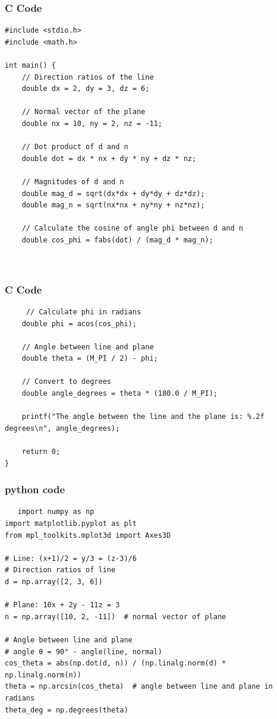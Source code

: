 \documentclass{beamer}
\begin{document}
\begin{frame}[fragile]
    \frametitle{C Code}
    \begin{lstlisting}
#include <stdio.h>
#include <math.h>

int main() {
    // Direction ratios of the line
    double dx = 2, dy = 3, dz = 6;
    
    // Normal vector of the plane
    double nx = 10, ny = 2, nz = -11;
    
    // Dot product of d and n
    double dot = dx * nx + dy * ny + dz * nz;
    
    // Magnitudes of d and n
    double mag_d = sqrt(dx*dx + dy*dy + dz*dz);
    double mag_n = sqrt(nx*nx + ny*ny + nz*nz);
    
    // Calculate the cosine of angle phi between d and n
    double cos_phi = fabs(dot) / (mag_d * mag_n);
    
    

     \end{lstlisting}
\end{frame}
\begin{frame}[fragile]
    \frametitle{C Code }
    \begin{lstlisting}
     // Calculate phi in radians
    double phi = acos(cos_phi);
    
    // Angle between line and plane
    double theta = (M_PI / 2) - phi;
    
    // Convert to degrees
    double angle_degrees = theta * (180.0 / M_PI);
    
    printf("The angle between the line and the plane is: %.2f degrees\n", angle_degrees);
    
    return 0;
}
\end{lstlisting}
\end{frame}
\begin{frame}[fragile]
    \frametitle{python code }
    \begin{lstlisting}
   import numpy as np
import matplotlib.pyplot as plt
from mpl_toolkits.mplot3d import Axes3D

# Line: (x+1)/2 = y/3 = (z-3)/6
# Direction ratios of line
d = np.array([2, 3, 6])

# Plane: 10x + 2y - 11z = 3
n = np.array([10, 2, -11])  # normal vector of plane

# Angle between line and plane
# angle θ = 90° - angle(line, normal)
cos_theta = abs(np.dot(d, n)) / (np.linalg.norm(d) * np.linalg.norm(n))
theta = np.arcsin(cos_theta)  # angle between line and plane in radians
theta_deg = np.degrees(theta)
    \end{lstlisting}
\end{frame}
\end{document}
